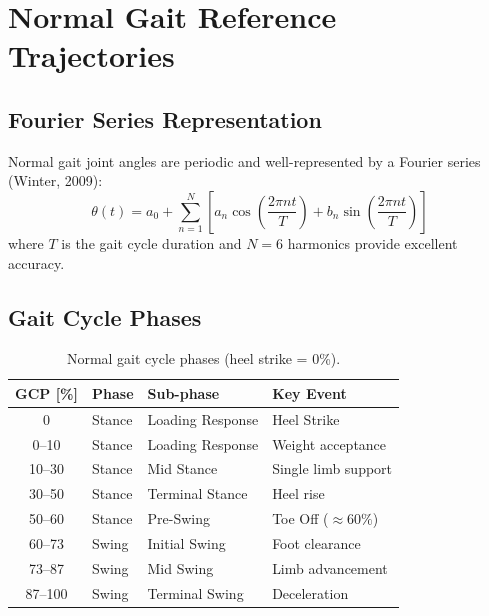 \documentclass[11pt,a4paper]{article}
\begin{document}
\section{Normal Gait Reference Trajectories}

\subsection{Fourier Series Representation}

Normal gait joint angles are periodic and well-represented by a Fourier series
(Winter, 2009):
\begin{equation}
    \theta(t) = a_0 + \sum_{n=1}^{N} \left[
        a_n \cos\left(\frac{2\pi n t}{T}\right) + b_n \sin\left(\frac{2\pi n t}{T}\right)
    \right]
    \label{eq:fourier}
\end{equation}
where $T$ is the gait cycle duration and $N = 6$ harmonics provide excellent accuracy.

\subsection{Gait Cycle Phases}

\begin{table}[H]
\centering
\caption{Normal gait cycle phases (heel strike = 0\%).}
\label{tab:gait_phases}
\begin{tabular}{@{}clll@{}}
\toprule
\textbf{GCP [\%]} & \textbf{Phase} & \textbf{Sub-phase} & \textbf{Key Event} \\
\midrule
0     & Stance & Loading Response & Heel Strike \\
0--10 & Stance & Loading Response & Weight acceptance \\
10--30 & Stance & Mid Stance & Single limb support \\
30--50 & Stance & Terminal Stance & Heel rise \\
50--60 & Stance & Pre-Swing & Toe Off ($\approx 60\%$) \\
\midrule
60--73 & Swing & Initial Swing & Foot clearance \\
73--87 & Swing & Mid Swing & Limb advancement \\
87--100 & Swing & Terminal Swing & Deceleration \\
\bottomrule
\end{tabular}
\end{table}
\end{document}

